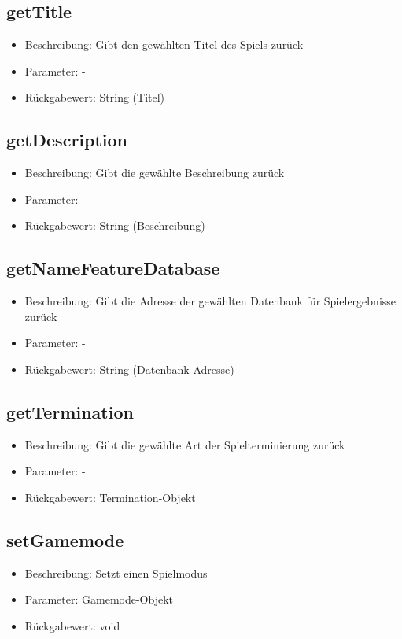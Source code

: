 \documentclass[a4paper]{scrreprt}
\begin{document}
    \subsection{getTitle}
    \begin{itemize}
        \item Beschreibung: Gibt den gewählten Titel des Spiels zurück
        \item Parameter: -
        \item Rückgabewert: String (Titel)
    \end{itemize}
    \subsection{getDescription}
    \begin{itemize}
        \item Beschreibung: Gibt die gewählte Beschreibung zurück
        \item Parameter: -
        \item Rückgabewert: String (Beschreibung)
    \end{itemize}
    \subsection{getNameFeatureDatabase}
    \begin{itemize}
        \item Beschreibung: Gibt die Adresse der gewählten Datenbank für Spielergebnisse zurück
        \item Parameter: -
        \item Rückgabewert: String (Datenbank-Adresse)
    \end{itemize}
    \subsection{getTermination}
    \begin{itemize}
        \item Beschreibung: Gibt die gewählte Art der Spielterminierung zurück
        \item Parameter: -
        \item Rückgabewert: Termination-Objekt
    \end{itemize}
    \subsection{setGamemode}
    \begin{itemize}
        \item Beschreibung: Setzt einen Spielmodus
        \item Parameter: Gamemode-Objekt
        \item Rückgabewert: void
    \end{itemize}
\end{document}
